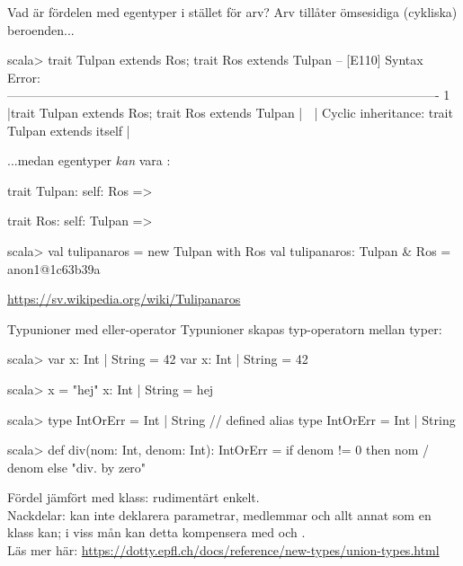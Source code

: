 \begin{Slide}{Vad är fördelen med egentyper i stället för arv?}
\SlideFontSmall
Arv tillåter  ömsesidiga (cykliska) beroenden...

\begin{REPLsmall}
scala> trait Tulpan extends Ros; trait Ros extends Tulpan
-- [E110] Syntax Error: -------------------------------------------------------------------------------------------------------
1 |trait Tulpan extends Ros; trait Ros extends Tulpan
  |                     ^^^
  |                     Cyclic inheritance: trait Tulpan extends itself
  |
\end{REPLsmall}

\vspace{0.5em}
...medan egentyper \emph{kan} vara :
\begin{Code}
trait Tulpan: 
  self: Ros => 

trait Ros:
  self: Tulpan => 
\end{Code}

\begin{REPLnonum}
scala> val tulipanaros = new Tulpan with Ros
val tulipanaros: Tulpan & Ros = anon1@1c63b39a
\end{REPLnonum}
\url{https://sv.wikipedia.org/wiki/Tulipanaros}
\end{Slide}



\begin{Slide}{Typunioner med eller-operator}\SlideFontSmall
Typunioner skapas typ-operatorn \code{|} mellan typer: 
\begin{REPLsmall}
scala> var x: Int | String = 42
var x: Int | String = 42

scala> x = "hej" 
x: Int | String = hej

scala> type IntOrErr = Int | String
// defined alias type IntOrErr = Int | String

scala> def div(nom: Int, denom: Int): IntOrErr = 
          if denom != 0 then nom / denom else "div. by zero"
\end{REPLsmall}
Fördel jämfört med klass: rudimentärt enkelt.\\ Nackdelar: kan inte deklarera parametrar, medlemmar och allt annat som en klass kan; i viss mån kan detta kompensera med  och .\\ 
{\SlideFontTiny Läs mer här:
\url{https://dotty.epfl.ch/docs/reference/new-types/union-types.html}
}
\end{Slide}


